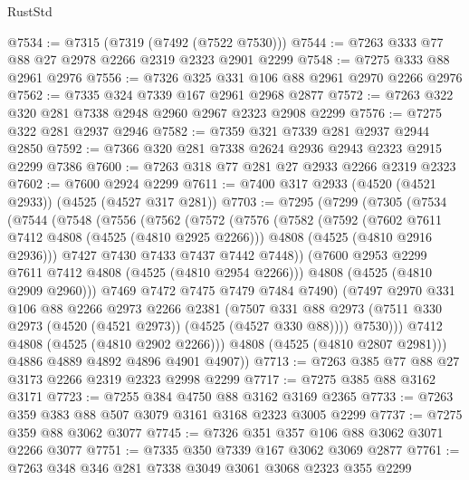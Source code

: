 \begin{lexlean}{RustStd}
\begin{coremodule}
{\begin{coremodule}
{{{{{{{{{{{{{{@7534 := @7315 (@7319 (@7492 (@7522 @7530)))
@7544 := @7263 @333 @77 @88 @27 @2978 @2266 @2319 @2323 @2901 @2299
@7548 := @7275 @333 @88 @2961 @2976
@7556 := @7326 @325 @331 @106 @88 @2961 @2970 @2266 @2976
@7562 := @7335 @324 @7339 @167 @2961 @2968 @2877
@7572 := @7263 @322 @320 @281 @7338 @2948 @2960 @2967 @2323 @2908 @2299
@7576 := @7275 @322 @281 @2937 @2946
@7582 := @7359 @321 @7339 @281 @2937 @2944 @2850
@7592 := @7366 @320 @281 @7338 @2624 @2936 @2943 @2323 @2915 @2299 @7386
@7600 := @7263 @318 @77 @281 @27 @2933 @2266 @2319 @2323
@7602 := @7600 @2924 @2299
@7611 := @7400 @317 @2933 (@4520 (@4521 @2933)) (@4525 (@4527 @317 @281))
@7703 := @7295
    (@7299
      (@7305
        (@7534
          (@7544
            (@7548
              (@7556
                (@7562
                  (@7572
                    (@7576
                      (@7582
                        (@7592
                          (@7602 @7611 @7412 @4808 (@4525 (@4810 @2925 @2266)))
                          @4808
                          (@4525 (@4810 @2916 @2936)))
                        @7427
                        @7430
                        @7433
                        @7437
                        @7442
                        @7448))
                    (@7600 @2953 @2299 @7611 @7412 @4808 (@4525 (@4810 @2954 @2266)))
                    @4808
                    (@4525 (@4810 @2909 @2960)))
                  @7469
                  @7472
                  @7475
                  @7479
                  @7484
                  @7490)
                (@7497
                  @2970
                  @331
                  @106
                  @88
                  @2266
                  @2973
                  @2266
                  @2381
                  (@7507
                    @331
                    @88
                    @2973
                    (@7511 @330 @2973 (@4520 (@4521 @2973)) (@4525 (@4527 @330 @88))))
                  @7530)))
            @7412
            @4808
            (@4525 (@4810 @2902 @2266)))
          @4808
          (@4525 (@4810 @2807 @2981)))
        @4886
        @4889
        @4892
        @4896
        @4901
        @4907))
@7713 := @7263 @385 @77 @88 @27 @3173 @2266 @2319 @2323 @2998 @2299
@7717 := @7275 @385 @88 @3162 @3171
@7723 := @7255 @384 @4750 @88 @3162 @3169 @2365
@7733 := @7263 @359 @383 @88 @507 @3079 @3161 @3168 @2323 @3005 @2299
@7737 := @7275 @359 @88 @3062 @3077
@7745 := @7326 @351 @357 @106 @88 @3062 @3071 @2266 @3077
@7751 := @7335 @350 @7339 @167 @3062 @3069 @2877
@7761 := @7263 @348 @346 @281 @7338 @3049 @3061 @3068 @2323 @355 @2299
}}}}}}}}}}}}}}
\end{coremodule}}
\end{coremodule}
\end{lexlean}
